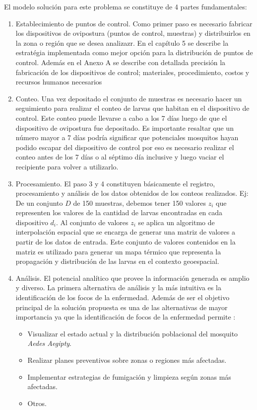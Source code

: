
El modelo solución para este problema se constituye de 4 partes fundamentales:

\begin{enumerate}[style=multiline,leftmargin=1.5cm]
    \item Establecimiento de puntos de control. Como primer paso es necesario fabricar los dispositivos de
     ovipostura (puntos de control, muestras) y distribuirlos en la zona o región que se desea analizazr. En el
     capítulo 5 se describe la estratégia implementada como mejor opción para la distribución de puntos de control.
     Además en el Anexo A se describe con detallada precisión la fabricación de los dispositivos de control;
     materiales, procedimiento, costos y recursos humanos necesarios
    
    \item Conteo. Una vez depositado el conjunto de muestras es necesario hacer un seguimiento para realizar el conteo de larvas que habitan en el dispositivo de control. Este conteo puede llevarse a cabo a los 7 días luego de que el dispositivo de ovipostura fue depositado. Es importante resaltar que un número mayor a 7 días podría significar que potenciales mosquitos hayan podido escapar del dispositivo de control por eso es necesario realizar el conteo antes de los 7 días o al séptimo día inclusive y luego vaciar el recipiente para volver a utilizarlo. 
    
    \item Procesamiento. El paso 3 y 4 constituyen básicamente el registro, procesamiento y análisis de los datos obtenidos de los conteos realizados. Ej: De un conjunto $D$ de 150 muestras, debemos tener 150 valores $z_{i}$ que representen los valores de la cantidad de larvas encontradas en cada dispositivo $d_{i}$. Al conjunto de valores $z_{i}$ se aplica un algoritmo de interpolación espacial que se encarga de generar una matriz de valores a partir de los datos de entrada. Este conjunto de valores contenidos en la matriz es utilizado para generar un mapa térmico que representa la propagación y distribución de las larvas en el contexto geoespacial.

    \item Análisis. El potencial analítico que provee la información generada es amplio y diverso. La primera alternativa de análisis y la más intuitiva es la identificación de los focos de la enfermedad. Además de ser el objetivo principal de la solución propuesta es una de las alternativas de mayor importancia ya que la identificación de focos de la enfermedad permite :
    \begin{itemize}
        \item Visualizar el estado actual y la distribución poblacional del mosquito \textit{Aedes Aegipty}.
        \item Realizar planes preventivos sobre zonas o regiones más afectadas.
        \item Implementar estrategias de fumigación y limpieza según zonas más afectadas.
        \item Otros.
    \end{itemize}
\end{enumerate}
